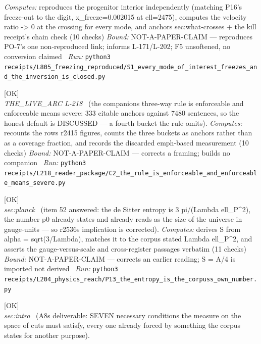 \begin{description}
\emph{Computes:} reproduces the progenitor interior independently (matching P16's freeze-out to the digit, x\_freeze=0.002015 at ell=2475), computes the velocity ratio -> 0 at the crossing for every mode, and anchors sec:what-crosses + the kill receipt's chain check (10 checks)
 \emph{Bound:} NOT-A-PAPER-CLAIM --- reproduces PO-7's one non-reproduced link; informs L-171/L-202; F5 unsoftened, no conversion claimed
\ \emph{Run:} \texttt{python3 receipts/L805\_freezing\_reproduced/S1\_every\_mode\_of\_interest\_freezes\_and\_the\_inversion\_is\_closed.py}
\item[\label{rcpt:C2_the_rule_is_enforceable_and_enforceable_means_severe}\texttt{C2\_the\_rule\_is\_enforceable\_and\_enforceable\_means\_severe}]\hfill\textsf{[OK]}\\
\textit{THE\_LIVE\_ARC L-218} \ (the companions three-way rule is enforceable and enforceable means severe: 333 citable anchors against 7480 sentences, so the honest default is DISCUSSED --- a fourth bucket the rule omits). 
\emph{Computes:} recounts the rows r2415 figures, counts the three buckets as anchors rather than as a coverage fraction, and records the discarded emph-based measurement (10 checks)
 \emph{Bound:} NOT-A-PAPER-CLAIM --- corrects a framing; builds no companion
\ \emph{Run:} \texttt{python3 receipts/L218\_reader\_package/C2\_the\_rule\_is\_enforceable\_and\_enforceable\_means\_severe.py}
\item[\label{rcpt:P13_the_entropy_is_the_corpuss_own_number}\texttt{P13\_the\_entropy\_is\_the\_corpuss\_own\_number}]\hfill\textsf{[OK]}\\
\textit{sec:planck} \ (item 52 answered: the de Sitter entropy is 3 pi/(Lambda ell\_P\textasciicircum{}2), the number p0 already states and already reads as the size of the universe in gauge-units --- so r2536s implication is corrected). 
\emph{Computes:} derives S from alpha = sqrt(3/Lambda), matches it to the corpus stated Lambda ell\_P\textasciicircum{}2, and asserts the gauge-versus-scale and cross-register passages verbatim (11 checks)
 \emph{Bound:} NOT-A-PAPER-CLAIM --- corrects an earlier reading; S = A/4 is imported not derived
\ \emph{Run:} \texttt{python3 receipts/L204\_physics\_reach/P13\_the\_entropy\_is\_the\_corpuss\_own\_number.py}
\item[\label{rcpt:S1_seven_necessary_conditions_on_the_measure}\texttt{S1\_seven\_necessary\_conditions\_on\_the\_measure}]\hfill\textsf{[OK]}\\
\textit{sec:intro} \ (A8s deliverable: SEVEN necessary conditions the measure on the space of cuts must satisfy, every one already forced by something the corpus states for another purpose). 

\end{description}
